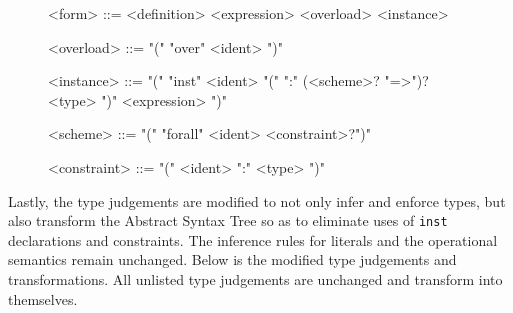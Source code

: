 \documentclass[11pt,a4paper]{article}
\begin{document}
\begin{figure}[H]
\small
\setlength{\grammarindent}{8em}
\renewcommand{\grammarlabel}[2]{\synt{#1}\hfill#2}
\begin{grammar}
<form> ::= <definition>
    \alt <expression>
    \alt <overload>
    \alt <instance>

<overload> ::= "(" "over" <ident> ")"

<instance> ::= "(" "inst" <ident> "(" ":" (<scheme>? "=>")? <type> ")" <expression> ")"

<scheme> ::= "(" "forall" <ident> <constraint>?")"

<constraint> ::= "(" <ident> ":" <type> ")"
\end{grammar}
\end{figure}


Lastly, the type judgements are modified to not only infer and enforce types,
but also transform the Abstract Syntax Tree so as to eliminate uses of \verb|inst|
declarations and constraints. The inference rules for literals and the operational
semantics remain unchanged. Below is the modified type judgements and transformations.
All unlisted type judgements are unchanged and transform into themselves.
\end{document}
